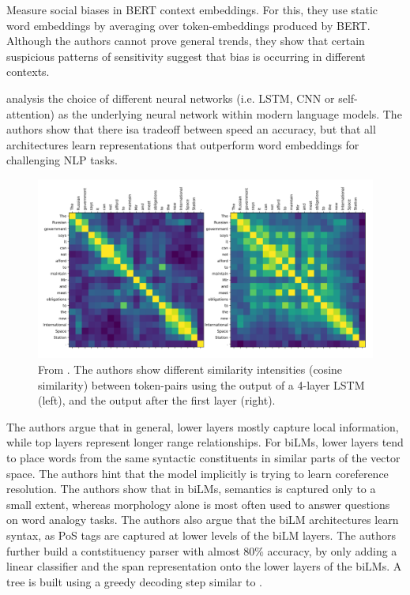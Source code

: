 \documentclass[a4paper,12pt,twoside,openright]{report}
\begin{document}
\cite{may19} Measure social biases in BERT context embeddings.
For this, they use static word embeddings by averaging over token-embeddings produced by BERT.
Although the authors cannot prove general trends, they show that certain suspicious patterns of sensitivity suggest that bias is occurring in different contexts.

\cite{peters18} analysis the choice of different neural networks (i.e. LSTM, CNN or self-attention) as the underlying neural network within modern language models.
The authors show that there isa  tradeoff between speed an accuracy, but that all architectures learn representations that outperform word embeddings for challenging NLP tasks.

\begin{figure}[H]
	\center
  \includegraphics[width=0.6\linewidth]{./assets/relatedwork/self_attention_analysis.png}
  \caption{From \cite{peters18}. The authors show different similarity intensities (cosine similarity) between token-pairs using the output of a 4-layer LSTM (left), and the output after the first layer (right).}
  \label{fig:embeddings_by_language}
\end{figure}

The authors argue that in general, lower layers mostly capture local information, while top layers represent longer range relationships.
For biLMs, lower layers tend to place words from the same syntactic constituents in similar parts of the vector space.
The authors hint that the model implicitly is trying to learn coreference resolution.
The authors show that in biLMs, semantics is captured only to a small extent, whereas morphology alone is most often used to answer questions on word analogy tasks.
The authors also argue that the biLM architectures learn syntax, as PoS tags are captured at lower levels of the biLM layers.
The authors further build a contstituency parser with almost 80\% accuracy, by only adding a linear classifier and the span representation onto the lower layers of the biLMs.
A tree is built using a greedy decoding step similar to \cite{joshi19b}.
\end{document}
